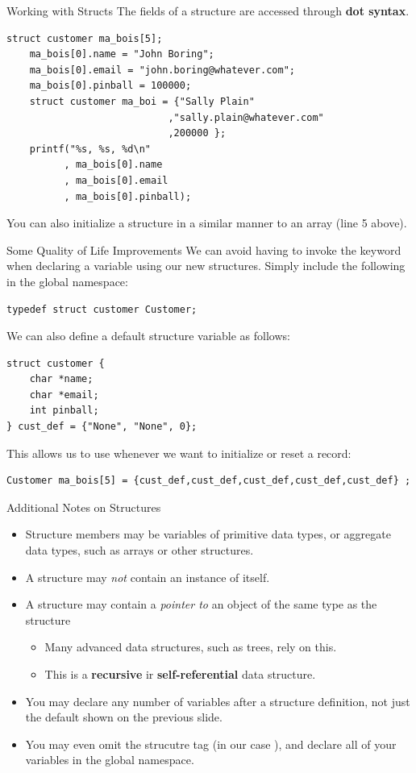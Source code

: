 \documentclass[11pt]{beamer}
\let\OldTexttt\texttt
\renewcommand{\texttt}[1]{\OldTexttt{\color{teal}{#1}}}
\begin{document}
\begin{frame}[fragile=singleslide]{Working with Structs}
The fields of a structure are accessed through \textbf{dot syntax}.
\begin{lstlisting}[style=C]
	struct customer ma_bois[5];
	ma_bois[0].name = "John Boring";
	ma_bois[0].email = "john.boring@whatever.com";
	ma_bois[0].pinball = 100000;
	struct customer ma_boi = {"Sally Plain"
							,"sally.plain@whatever.com"
							,200000 };
	printf("%s, %s, %d\n"
	      , ma_bois[0].name
	      , ma_bois[0].email
	      , ma_bois[0].pinball);
\end{lstlisting}
You can also initialize a structure in a similar manner to an array (line 5 above).
\end{frame}

\begin{frame}[fragile=singleslide]{Some Quality of Life Improvements}
We can avoid having to invoke the \texttt{struct} keyword when declaring a variable using our new structures.  Simply include the following in the global namespace:
\begin{lstlisting}[style=C]
typedef struct customer Customer;
\end{lstlisting}
We can also define a default structure variable as follows:
\begin{lstlisting}[style=C]
struct customer {
	char *name;
	char *email;
	int pinball;
} cust_def = {"None", "None", 0};
\end{lstlisting}
This allows us to use \texttt{cust\_def} whenever we want to initialize or reset a record:
\begin{lstlisting}[style=C]
	Customer ma_bois[5] = {cust_def,cust_def,cust_def,cust_def,cust_def} ;
\end{lstlisting}
\end{frame}

\begin{frame}{Additional Notes on Structures}
\begin{itemize}
\item Structure members may be variables of primitive data types, or aggregate data types, such as arrays or other structures.
\item A structure may \emph{not} contain an instance of itself.
\item A structure may contain a \emph{pointer to} an object of the same type as the structure
\begin{itemize}
\item Many advanced data structures, such as trees, rely on this.
\item This is a \textbf{recursive} ir \textbf{self-referential} data structure.
\end{itemize}
\item You may declare any number of variables after a structure definition, not just the default shown on the previous slide. 
\item You may even omit the strucutre tag (in our case \texttt{customer}), and declare all of your variables in the global namespace.  
\end{itemize}
\end{frame}
\end{document}
